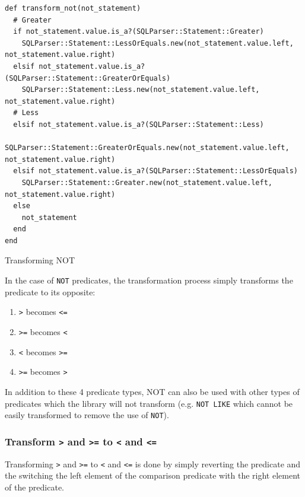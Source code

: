 \begin{listing}[h]
\begin{verbatim}
def transform_not(not_statement)
  # Greater
  if not_statement.value.is_a?(SQLParser::Statement::Greater)
    SQLParser::Statement::LessOrEquals.new(not_statement.value.left, not_statement.value.right)
  elsif not_statement.value.is_a?(SQLParser::Statement::GreaterOrEquals)
    SQLParser::Statement::Less.new(not_statement.value.left, not_statement.value.right)
  # Less
  elsif not_statement.value.is_a?(SQLParser::Statement::Less)
    SQLParser::Statement::GreaterOrEquals.new(not_statement.value.left, not_statement.value.right)
  elsif not_statement.value.is_a?(SQLParser::Statement::LessOrEquals)
    SQLParser::Statement::Greater.new(not_statement.value.left, not_statement.value.right)
  else
    not_statement
  end
end
\end{verbatim}
\caption{Transforming NOT}
\label{fig:transforming_not}
\end{listing}


In the case of \texttt{NOT} predicates, the transformation process simply transforms the predicate to its opposite:
\begin{enumerate}
    \item \texttt{>} becomes \texttt{<=}
    \item \texttt{>=} becomes \texttt{<}
    \item \texttt{<} becomes \texttt{>=}
    \item \texttt{>=} becomes \texttt{>}
\end{enumerate}

In addition to these 4 predicate types, NOT can also be used with other types of predicates which the library will not transform (e.g. \texttt{NOT LIKE} which cannot be easily transformed to remove the use of \texttt{NOT}).

\subsubsection{Transform \texttt{>} and \texttt{>=} to \texttt{<} and \texttt{<=}}

Transforming \texttt{>} and \texttt{>=} to \texttt{<} and \texttt{<=} is done by simply reverting the predicate and the switching the left element of the comparison predicate with the right element of the predicate.

